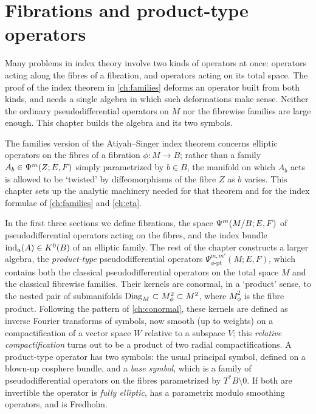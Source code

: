 \chapter{Fibrations and product-type operators}\label{ch:product}
\providecommand{\RelC}[2]{{}^{#1}\overline{#2}}
\providecommand{\Psipt}[1]{\Psi^{#1}_{\phi\text{-}\mathrm{pt}}}
\providecommand{\Dfm}{\operatorname{Dfm}}
\providecommand{\fib}{\mathrm{fib}}
\providecommand{\Sigmapt}[1]{\Sigma^{#1}_{\phi}}
\providecommand{\Symq}[1]{S^{#1-[1]}}

Many problems in index theory involve two kinds of operators at once: operators
acting along the fibres of a fibration, and operators acting on its total space.
The proof of the index theorem in \cref{ch:families} deforms an operator built
from both kinds, and needs a single algebra in which such deformations make sense.
Neither the ordinary pseudodifferential operators on $M$ nor the fibrewise
families are large enough. This chapter builds the algebra and its two symbols.

The families version of the Atiyah--Singer index theorem concerns elliptic
operators on the fibres of a fibration $\phi:M\longrightarrow B$; rather than a
family $A_b\in\Psi^{m}(Z;E,F)$ simply parametrized by $b\in B$, the manifold on
which $A_b$ acts is allowed to be `twisted' by diffeomorphisms of the fibre $Z$
as $b$ varies. This chapter sets up the analytic machinery needed for that
theorem and for the index formulae of \cref{ch:families} and \cref{ch:eta}.

In the first three sections we define fibrations, the space
$\Psi^{m}(M/B;E,F)$ of pseudodifferential operators acting on the fibres, and
the index bundle $\operatorname{ind}_a(A)\in K^0(B)$ of an elliptic family. The rest of the
chapter constructs a larger algebra, the \emph{product-type} pseudodifferential
operators $\Psipt{m,m'}(M;E,F)$, which contains both the classical
pseudodifferential operators on the total space $M$ and the classical fibrewise
families.
Their kernels are conormal, in a `product' sense, to the nested pair of
submanifolds $\operatorname{Diag}_M\subset M^2_\phi\subset M^2$, where $M^2_\phi$ is the fibre
product. Following the pattern of \cref{ch:conormal}, these kernels are
defined as inverse Fourier transforms of symbols, now smooth (up to weights) on a
compactification of a vector space $W$ relative to a subspace $V$; this
\emph{relative compactification} turns out to be a product of two radial
compactifications. A product-type operator has two symbols: the usual principal
symbol, defined on a blown-up cosphere bundle, and a \emph{base symbol}, which is
a family of pseudodifferential operators on the fibres parametrized by
$T^*B\setminus0$. If both are invertible the operator is \emph{fully elliptic},
has a parametrix modulo smoothing operators, and is Fredholm.

